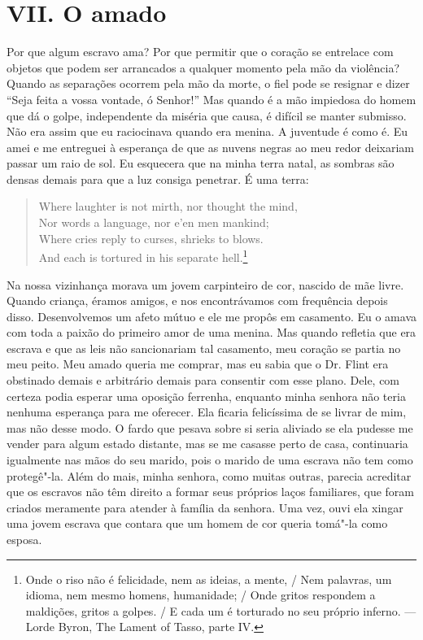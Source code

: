 \chapter{VII. O amado}

Por que algum escravo ama? Por que
permitir que o coração se entrelace com objetos que podem ser arrancados
a qualquer momento pela mão da violência? Quando as separações ocorrem
pela mão da morte, o fiel pode se resignar e dizer ``Seja feita a vossa
vontade, ó Senhor!'' Mas quando é a mão impiedosa do homem que dá o
golpe, independente da miséria que causa, é difícil se manter submisso.
Não era assim que eu raciocinava quando era menina. A juventude é como
é. Eu amei e me entreguei à esperança de que as nuvens negras ao meu
redor deixariam passar um raio de sol. Eu esquecera que na minha terra
natal, as sombras são densas demais para que a luz consiga penetrar. É
uma terra:

\begin{verse}
Where laughter is not mirth, nor thought the \qb mind,\\
Nor words a language, nor e'en men \qb mankind;\\
Where cries reply to curses, shrieks to blows.\\
And each is tortured in his separate hell.\footnote{Onde o riso não é felicidade,
nem as ideias, a mente, / Nem palavras, um idioma, nem mesmo homens,
humanidade; / Onde gritos respondem a maldições, gritos a golpes. / E
cada um é torturado no seu próprio inferno. --- Lorde Byron, The Lament
of Tasso, parte IV.}
\end{verse}

Na nossa vizinhança morava um jovem
carpinteiro de cor, nascido de mãe livre. Quando criança, éramos amigos,
e nos encontrávamos com frequência depois disso. Desenvolvemos um afeto
mútuo e ele me propôs em casamento. Eu o amava com toda a paixão do
primeiro amor de uma menina. Mas quando refletia que era escrava e que
as leis não sancionariam tal casamento, meu coração se partia no meu
peito. Meu amado queria me comprar, mas eu sabia que o Dr. Flint era
obstinado demais e arbitrário demais para consentir com esse plano.
Dele, com certeza podia esperar uma oposição ferrenha, enquanto minha
senhora não teria nenhuma esperança para me oferecer. Ela ficaria
felicíssima de se livrar de mim, mas não desse modo. O fardo que pesava
sobre si seria aliviado se ela pudesse me vender para algum estado
distante, mas se me casasse perto de casa, continuaria igualmente nas
mãos do seu marido, pois o marido de uma escrava não tem como
protegê"-la. Além do mais, minha senhora, como muitas outras, parecia
acreditar que os escravos não têm direito a formar seus próprios laços
familiares, que foram criados meramente para atender à família da
senhora. Uma vez, ouvi ela xingar uma jovem escrava que contara que um
homem de cor queria tomá"-la como esposa.

